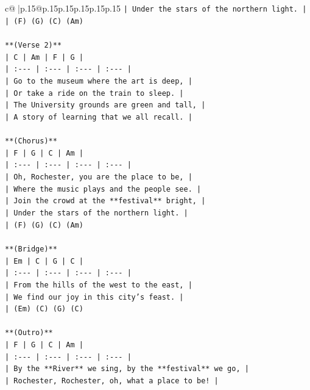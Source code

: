 \documentclass{article}
\begin{document}
{\begin{supertabular}{c@{$\;$}|p{.15\linewidth}@{}p{.15\linewidth}p{.15\linewidth}p{.15\linewidth}p{.15\linewidth}p{.15\linewidth}}
{{{\texttt{| Under the stars of the northern light. |} \\
\texttt{| (F) (G) (C) (Am)} \\
\\ 
\texttt{**(Verse 2)**} \\
\texttt{| C | Am | F | G |} \\
\texttt{| :{-}{-}{-} | :{-}{-}{-} | :{-}{-}{-} | :{-}{-}{-} |} \\
\texttt{| Go to the museum where the art is deep, |} \\
\texttt{| Or take a ride on the train to sleep. |} \\
\texttt{| The University grounds are green and tall, |} \\
\texttt{| A story of learning that we all recall. |} \\
\\ 
\texttt{**(Chorus)**} \\
\texttt{| F | G | C | Am |} \\
\texttt{| :{-}{-}{-} | :{-}{-}{-} | :{-}{-}{-} | :{-}{-}{-} |} \\
\texttt{| Oh, Rochester, you are the place to be, |} \\
\texttt{| Where the music plays and the people see. |} \\
\texttt{| Join the crowd at the **festival** bright, |} \\
\texttt{| Under the stars of the northern light. |} \\
\texttt{| (F) (G) (C) (Am)} \\
\\ 
\texttt{**(Bridge)**} \\
\texttt{| Em | C | G | C |} \\
\texttt{| :{-}{-}{-} | :{-}{-}{-} | :{-}{-}{-} | :{-}{-}{-} |} \\
\texttt{| From the hills of the west to the east, |} \\
\texttt{| We find our joy in this city's feast. |} \\
\texttt{| (Em) (C) (G) (C)} \\
\\ 
\texttt{**(Outro)**} \\
\texttt{| F | G | C | Am |} \\
\texttt{| :{-}{-}{-} | :{-}{-}{-} | :{-}{-}{-} | :{-}{-}{-} |} \\
\texttt{| By the **River** we sing, by the **festival** we go, |} \\
\texttt{| Rochester, Rochester, oh, what a place to be! |} \\
}}}
\end{supertabular}}
\end{document}

